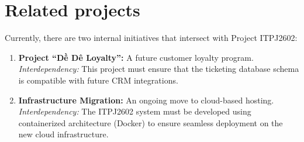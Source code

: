 \section{Related projects}

Currently, there are two internal initiatives that intersect with Project ITPJ2602:
\begin{enumerate}
    \item \textbf{Project ``Dề Dê Loyalty'':} A future customer loyalty program. \textit{Interdependency:} This project must ensure that the ticketing database schema is compatible with future CRM integrations.
    \item \textbf{Infrastructure Migration:} An ongoing move to cloud-based hosting. \textit{Interdependency:} The ITPJ2602 system must be developed using containerized architecture (Docker) to ensure seamless deployment on the new cloud infrastructure.
\end{enumerate}